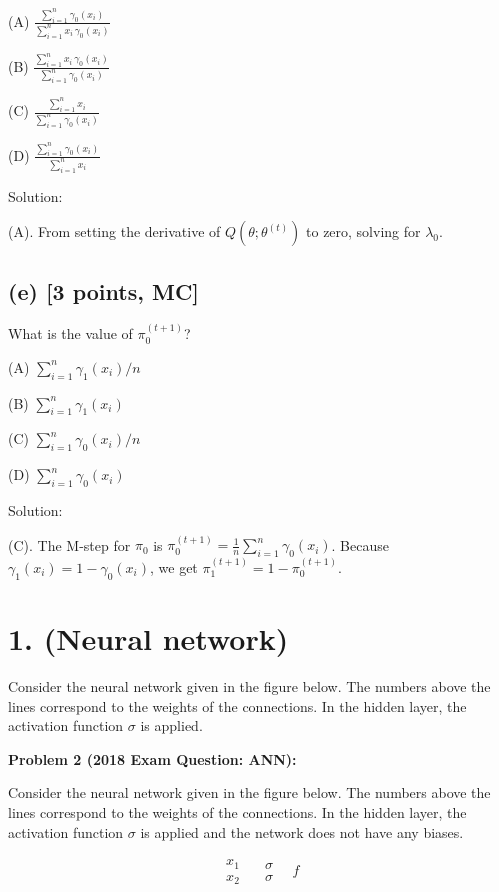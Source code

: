 \documentclass[twocolumn]{article}
\begin{document}
\begin{spacing}{1}
(A) \(\frac{\sum_{i=1}^n \gamma_0(x_i)}{\sum_{i=1}^n x_i\,\gamma_0(x_i)}\)

(B) \(\frac{\sum_{i=1}^n x_i\,\gamma_0(x_i)}{\sum_{i=1}^n \gamma_0(x_i)}\)

(C) \(\frac{\sum_{i=1}^n x_i}{\sum_{i=1}^n \gamma_0(x_i)}\)

(D) \(\frac{\sum_{i=1}^n \gamma_0(x_i)}{\sum_{i=1}^n x_i}\)

Solution:

(A). From setting the derivative of \(Q(\theta;\theta^{(t)})\) to zero, solving for \(\lambda_0\).

\subsection*{(e) [3 points, MC]}
What is the value of \(\pi_0^{(t+1)}\)?

(A) \(\sum_{i=1}^n \gamma_1(x_i) / n\)

(B) \(\sum_{i=1}^n \gamma_1(x_i)\)

(C) \(\sum_{i=1}^n \gamma_0(x_i) / n\)

(D) \(\sum_{i=1}^n \gamma_0(x_i)\)

Solution:

(C). The M-step for \(\pi_0\) is \(\pi_0^{(t+1)} = \frac{1}{n}\sum_{i=1}^n \gamma_0(x_i)\). Because \(\gamma_1(x_i)=1-\gamma_0(x_i)\), we get \(\pi_1^{(t+1)}=1-\pi_0^{(t+1)}\).

\section{1. (Neural network)}
Consider the neural network given in the figure below. The numbers above the lines correspond
to the weights of the connections. In the hidden layer, the activation function $\sigma$ is applied.

\bigskip
\noindent
\textbf{Problem 2 (2018 Exam Question: ANN):}

Consider the neural network given in the figure below. The numbers above the lines correspond
to the weights of the connections. In the hidden layer, the activation function $\sigma$ is applied
and the network does not have any biases.

\[
\begin{array}{c}
x_1 \\[6pt]
x_2
\end{array}
\quad
\begin{array}{c}
\sigma\\[-3pt]
\sigma
\end{array}
\quad
f
\]


\end{spacing}
\end{document}
